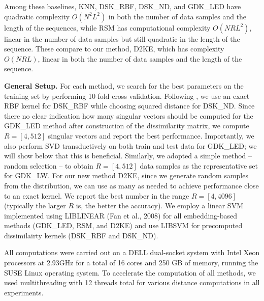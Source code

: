 \documentclass{article}
\newcommand{\1}{\mathbf{1}}
\begin{document}
Among these baselines, KNN, DSK\_RBF, DSK\_ND, and GDK\_LED have quadratic complexity $O(N^2L^2)$ in both the number of data samples and the length of the sequences, while RSM has computational complexity $O(NRL^2)$, linear in the number of data samples but still quadratic in the length of the sequence. These compare to our method, D2KE, which has complexity $O(NRL)$, linear in both the number of data samples and the length of the sequence. 

\textbf{General Setup.} For each method, we search for the best parameters on the training set by performing 10-fold cross validation. Following \cite{haasdonk2004learning}, we use an exact RBF kernel for DSK\_RBF while choosing squared distance for DSK\_ND. Since there no clear indication how many singular vectors should be computed for the GDK\_LED method after construction of the dissimilarity matrix, we compute $R = [4, 512]$ singular vectors and report the best performance. Importantly, we also perform SVD transductively on both train and test data for GDK\_LED; we will show below that this is beneficial. Similarly, we adopted a simple method -- random selection -- to obtain $R = [4, 512]$ data samples as the representative set for GDK\_LW. For our new method D2KE, since we generate random samples from the distribution, we can use as many as needed to achieve performance close to an exact kernel. We report the best number in the range $R = [4, 4096]$ (typically the larger $R$ is, the better the accuracy). We employ a linear SVM implemented using LIBLINEAR (Fan et al., 2008) for all embedding-based methods (GDK\_LED, RSM, and D2KE) and use LIBSVM \cite{chang2011libsvm} for precomputed dissimilairty kernels (DSK\_RBF and DSK\_ND). 

All computations were carried out on a DELL dual-socket system with Intel Xeon processors at 2.93GHz for a total of 16 cores and 250 GB of memory, running the SUSE Linux operating system. To accelerate the computation of all methods, we used multithreading with 12 threads total for various distance computations in all experiments. 
\end{document}
